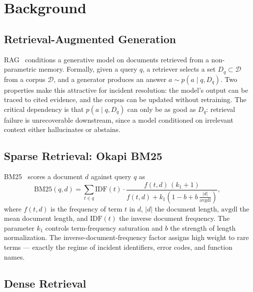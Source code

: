 \documentclass[12pt, a4paper]{article}
\begin{document}
\section{Background}
\label{sec:background}

\subsection{Retrieval-Augmented Generation}

RAG~\cite{lewis2020rag} conditions a generative model on documents retrieved from a non-parametric memory. Formally, given a query $q$, a retriever selects a set $D_q \subset \mathcal{D}$ from a corpus $\mathcal{D}$, and a generator produces an answer $a \sim p(a \mid q, D_q)$. Two properties make this attractive for incident resolution: the model's output can be traced to cited evidence, and the corpus can be updated without retraining. The critical dependency is that $p(a \mid q, D_q)$ can only be as good as $D_q$: retrieval failure is unrecoverable downstream, since a model conditioned on irrelevant context either hallucinates or abstains.

\subsection{Sparse Retrieval: Okapi BM25}

BM25~\cite{robertson2009bm25} scores a document $d$ against query $q$ as
\begin{equation}
\text{BM25}(q,d) = \sum_{t \in q} \text{IDF}(t) \cdot \frac{f(t,d)\,(k_1+1)}{f(t,d) + k_1\left(1 - b + b\,\frac{|d|}{\text{avgdl}}\right)},
\label{eq:bm25}
\end{equation}
where $f(t,d)$ is the frequency of term $t$ in $d$, $|d|$ the document length, $\text{avgdl}$ the mean document length, and $\text{IDF}(t)$ the inverse document frequency. The parameter $k_1$ controls term-frequency saturation and $b$ the strength of length normalization. The inverse-document-frequency factor assigns high weight to rare terms — exactly the regime of incident identifiers, error codes, and function names.

\subsection{Dense Retrieval}
\end{document}
